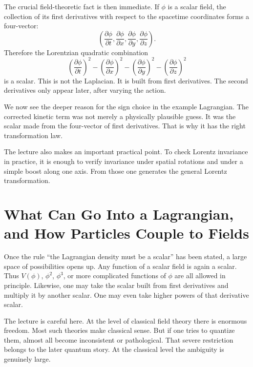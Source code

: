 The crucial field-theoretic fact is then immediate. If \(\phi\) is a scalar field, the collection of its first derivatives with respect to the spacetime coordinates forms a four-vector:
\begin{equation}
\left(
\frac{\partial\phi}{\partial t},
\frac{\partial\phi}{\partial x},
\frac{\partial\phi}{\partial y},
\frac{\partial\phi}{\partial z}
\right).
\end{equation}
Therefore the Lorentzian quadratic combination
\begin{equation}
\left(\frac{\partial\phi}{\partial t}\right)^2
-
\left(\frac{\partial\phi}{\partial x}\right)^2
-
\left(\frac{\partial\phi}{\partial y}\right)^2
-
\left(\frac{\partial\phi}{\partial z}\right)^2
\end{equation}
is a scalar. This is not the Laplacian. It is built from first derivatives. The second derivatives only appear later, after varying the action.

We now see the deeper reason for the sign choice in the example Lagrangian. The corrected kinetic term was not merely a physically plausible guess. It was the scalar made from the four-vector of first derivatives. That is why it has the right transformation law.

The lecture also makes an important practical point. To check Lorentz invariance in practice, it is enough to verify invariance under spatial rotations and under a simple boost along one axis. From those one generates the general Lorentz transformation.

\section{What Can Go Into a Lagrangian, and How Particles Couple to Fields}

Once the rule ``the Lagrangian density must be a scalar'' has been stated, a large space of possibilities opens up. Any function of a scalar field is again a scalar. Thus \(V(\phi)\), \(\phi^2\), \(\phi^3\), or more complicated functions of \(\phi\) are all allowed in principle. Likewise, one may take the scalar built from first derivatives and multiply it by another scalar. One may even take higher powers of that derivative scalar.

The lecture is careful here. At the level of classical field theory there is enormous freedom. Most such theories make classical sense. But if one tries to quantize them, almost all become inconsistent or pathological. That severe restriction belongs to the later quantum story. At the classical level the ambiguity is genuinely large.


